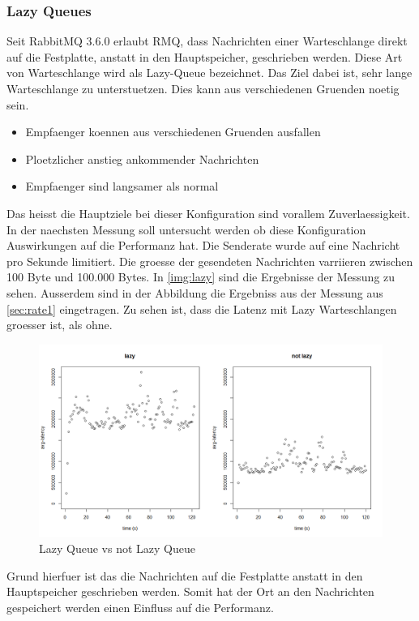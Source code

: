 \subsubsection{Lazy Queues}
Seit RabbitMQ 3.6.0 erlaubt RMQ, dass Nachrichten einer Warteschlange direkt auf die Festplatte, anstatt in den Hauptspeicher, geschrieben werden. Diese Art von Warteschlange wird als Lazy-Queue bezeichnet. Das Ziel dabei ist, sehr lange Warteschlange zu unterstuetzen. Dies kann aus verschiedenen Gruenden noetig sein. 
\begin{itemize}
    \item Empfaenger koennen aus verschiedenen Gruenden ausfallen
    \item Ploetzlicher anstieg ankommender Nachrichten
    \item Empfaenger sind langsamer als normal
\end{itemize}
Das heisst die Hauptziele bei dieser Konfiguration sind vorallem Zuverlaessigkeit. In der naechsten Messung soll untersucht werden ob diese Konfiguration Auswirkungen auf die Performanz hat. Die Senderate wurde auf eine Nachricht pro Sekunde limitiert. Die groesse der gesendeten Nachrichten varriieren zwischen 100 Byte und 100.000 Bytes.
In \autoref{img:lazy} sind die Ergebnisse der Messung zu sehen. Ausserdem sind in der Abbildung die Ergebniss aus der Messung aus \autoref{sec:rate1} eingetragen. Zu sehen ist, dass die Latenz mit Lazy Warteschlangen groesser ist, als ohne.
\begin{figure}
\center
  \includegraphics[width=1\textwidth]{images/lazy.png}
  \caption{Lazy Queue vs not Lazy Queue}
  \label{img:lazy}
\end{figure}
Grund hierfuer ist das die Nachrichten auf die Festplatte anstatt in den Hauptspeicher geschrieben werden. Somit hat der Ort an den Nachrichten gespeichert werden einen Einfluss auf die Performanz.



